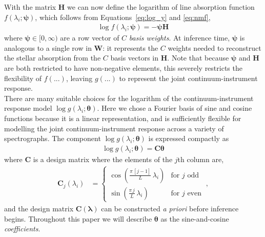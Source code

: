 \documentclass[modern]{aastex631}
\renewcommand{\vec}[1]{\mathbf{#1}}
\newcommand{\vectheta}{\boldsymbol{\theta}}
\newcommand{\vecpsi}{\boldsymbol{\psi}}
\newcommand{\vecW}{\mathbf{W}}
\newcommand{\vecH}{\mathbf{H}}
\begin{document}
\noindent{}With the matrix $\vec{H}$ we can now define the logarithm of line absorption function $f(\lambda_i;\vecpsi)$, which follows from Equations~\ref{eq:log_y} and \ref{eq:nmf},
\begin{align}
    \log{f(\lambda_i;\vecpsi)} = -\vecpsi\vecH \label{eq:f}
\end{align}
where $\vecpsi \in [0, \infty)$ are a row vector of $C$ \emph{basis weights}. At inference time, $\vecpsi$ is analogous to a single row in $\vecW$: it represents the $C$ weights needed to reconstruct the stellar absorption from the $C$ basis vectors in $\vecH$. Note that because $\vecpsi$ and $\vecH$ are both restricted to have non-negative elements, this severely restricts the flexibility of $f(...)$, leaving $g(...)$ to represent the joint continuum-instrument response.\\

There are many suitable choices for the logarithm of the continuum-instrument response model $\log{g(\lambda_i;\vectheta)}$. Here we chose a Fourier basis of sine and cosine functions because it is a linear representation, and is sufficiently flexible for modelling the joint continuum-instrument response across a variety of spectrographs. The component $\log{g(\lambda_i;\vectheta)}$ is expressed compactly as
\begin{align}
    \log{g(\lambda_i;\vectheta)} = \vec{C}\vectheta
\end{align}
where $\vec{C}$ is a design matrix where the elements of the $j$th column are, %
\begin{align}
    \vec{C}_{j}(\lambda_i) & = \left\{\begin{array}{cl}\displaystyle\cos\left(\frac{\pi\,[j-1]}{L}\,\lambda_i\right) & \mbox{for $j$ odd} \\[3ex]
                                       \displaystyle\sin\left(\frac{\pi\,j}{L}\,\lambda_i\right) & \mbox{for $j$ even}\end{array}\right. ~,
\end{align}
\noindent{}and the design matrix $\vec{C}(\vec{\lambda})$ can be constructed \emph{a priori} before inference begins. Throughout this paper we will describe $\vectheta$ as the sine-and-cosine \emph{coefficients}.\\
\end{document}
